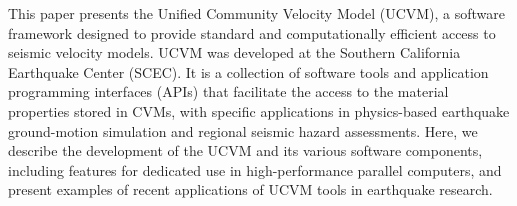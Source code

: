 This paper presents the Unified Community Velocity Model (UCVM), a software framework designed to provide standard and computationally efficient access to seismic velocity models. UCVM was developed at the Southern California Earthquake Center (SCEC). It is a collection of software tools and application programming interfaces (APIs) that facilitate the access to the material properties stored in CVMs, with specific applications in physics-based earthquake ground-motion simulation and regional seismic hazard assessments. Here, we describe the development of the UCVM and its various software components, including features for dedicated use in high-performance parallel computers, and present examples of recent applications of UCVM tools in earthquake research.










